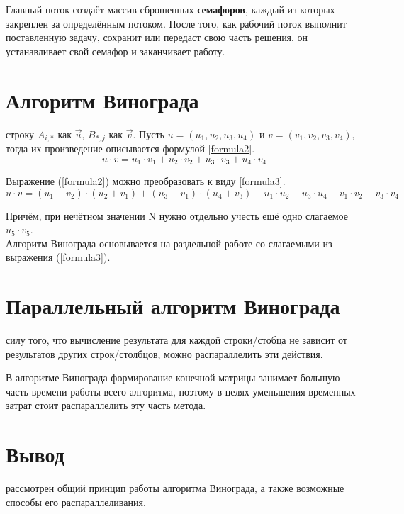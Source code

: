Главный поток создаёт массив сброшенных \textbf{семафоров}, каждый из которых закреплен за определённым потоком. После того, как рабочий поток выполнит поставленную задачу, сохранит или передаст свою часть решения, он устанавливает свой семафор и заканчивает работу.

\section{Алгоритм Винограда}
 строку $A_{i,*}$ как $\overrightarrow{u}$, $B_{*,j}$ как $\overrightarrow{v}$.
Пусть $u = (u_1, u_2, u_3, u_4)$ и $v = (v_1, v_2, v_3, v_4)$, тогда их произведение описывается формулой \ref{formula2}.
\begin{equation}\label{formula2}
	u \cdot v = u_1 \cdot v_1 + u_2 \cdot v_2 + u_3 \cdot v_3 + u_4 \cdot v_4
\end{equation}

Выражение (\ref{formula2}) можно преобразовать к виду \ref{formula3}.
\begin{equation}\label{formula3}
	u \cdot v = (u_1 + v_2)\cdot(u_2 + v_1) + (u_3 + v_1)\cdot(u_4 + v_3) - u_1\cdot u_2 - u_3\cdot u_4 - v_1\cdot v_2 - v_3\cdot v_4
\end{equation}

Причём, при нечётном значении N нужно отдельно учесть ещё одно слагаемое $u_5 \cdot v_5$. \\

Алгоритм Винограда основывается на раздельной работе со слагаемыми из выражения (\ref{formula3}).

\section{Параллельный алгоритм Винограда}
 силу того, что вычисление результата для каждой строки/стобца не зависит от результатов других строк/столбцов, можно распараллелить эти действия.
 
В алгоритме Винограда формирование конечной матрицы занимает большую часть времени работы всего алгоритма, поэтому в целях уменьшения временных затрат стоит распараллелить эту часть метода.

\section*{Вывод}
 рассмотрен общий принцип работы алгоритма Винограда, а также возможные способы его распараллеливания.